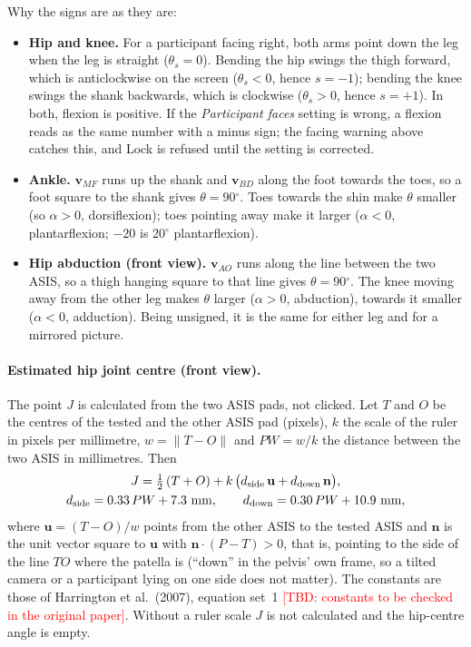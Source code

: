 \documentclass[a4paper,10pt]{article}
\newcommand{\dg}{\ensuremath{^\circ}}
\newcommand{\tbd}[1]{\textcolor{red}{[TBD: #1]}}
\begin{document}
\medskip\noindent Why the signs are as they are:
\begin{itemize}
\item \textbf{Hip and knee.} For a participant facing right, both arms point down the leg when the leg is straight ($\theta_s=0$). Bending the hip
  swings the thigh forward, which is anticlockwise on the screen ($\theta_s<0$, hence $s=-1$); bending the knee swings the shank
  backwards, which is clockwise ($\theta_s>0$, hence $s=+1$). In both, flexion is positive. If the \emph{Participant faces} setting is
  wrong, a flexion reads as the same number with a minus sign; the facing warning above catches this, and Lock is refused until the
  setting is corrected.
\item \textbf{Ankle.} $\mathbf{v}_{MF}$ runs up the shank and $\mathbf{v}_{BD}$ along the foot towards the toes, so a foot square to the
  shank gives $\theta=90\dg$. Toes towards the shin make $\theta$ smaller (so $\alpha>0$, dorsiflexion); toes pointing away make it larger
  ($\alpha<0$, plantarflexion; $-20$ is 20\dg{} plantarflexion).
\item \textbf{Hip abduction (front view).} $\mathbf{v}_{AO}$ runs along the line between the two ASIS, so a thigh hanging square to that line
  gives $\theta=90\dg$. The knee moving away from the other leg makes $\theta$ larger ($\alpha>0$, abduction), towards it smaller
  ($\alpha<0$, adduction). Being unsigned, it is the same for either leg and for a mirrored picture.
\end{itemize}

\paragraph{Estimated hip joint centre (front view).} The point $J$ is calculated from the two ASIS pads, not clicked. Let $T$ and $O$ be the
centres of the tested and the other ASIS pad (pixels), $k$ the scale of the ruler in pixels per millimetre, $w=\lVert T-O\rVert$ and
$PW=w/k$ the distance between the two ASIS in millimetres. Then
\begin{gather}
  J=\tfrac12\,(T+O)+k\,\bigl(d_{\text{side}}\,\mathbf{u}+d_{\text{down}}\,\mathbf{n}\bigr),\label{eq:hipcentre}\\
  d_{\text{side}}=0.33\,PW+7.3\ \text{mm},\qquad d_{\text{down}}=0.30\,PW+10.9\ \text{mm},\notag
\end{gather}
where $\mathbf{u}=(T-O)/w$ points from the other ASIS to the tested ASIS and $\mathbf{n}$ is the unit vector square to $\mathbf{u}$ with
$\mathbf{n}\cdot(P-T)>0$, that is, pointing to the side of the line $TO$ where the patella is (``down'' in the pelvis' own frame, so a tilted
camera or a participant lying on one side does not matter). The constants are those of Harrington et al.\ (2007), equation set~1
\tbd{constants to be checked in the original paper}. Without a ruler scale $J$ is not calculated and the hip-centre angle is empty.
\end{document}
